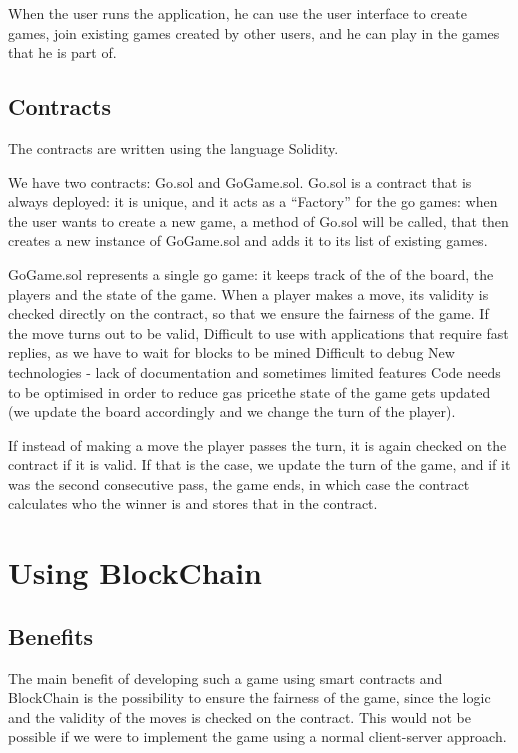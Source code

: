 \documentclass[10pt]{article}
\begin{document}
When the user runs the application, he can use the user interface to create games,
 join existing games created by other users, and he can play in the games that
 he is part of.

\subsection{Contracts}
The contracts are written using the language Solidity.

We have two contracts: {\ttfamily Go.sol} and {\ttfamily GoGame.sol}. {\ttfamily Go.sol}
is a contract that is always deployed: it is unique, and it acts as a ``Factory''
 for the go games: when the user wants to create a new game, a method of {\ttfamily Go.sol}
 will be called, that then creates a new instance of {\ttfamily GoGame.sol} and adds it
 to its list of existing games.

 {\ttfamily GoGame.sol} represents a single go game: it keeps track of the of
 the board, the players and the state of the game. When a player makes a move,
its validity is checked directly on the contract, so that we ensure the fairness
of the game. If the move turns out to be valid, Difficult to use with applications that require fast replies, as we have to wait for blocks to be mined
Difficult to debug
New technologies - lack of documentation and sometimes limited features
Code needs to be optimised in order to reduce gas pricethe state of the game gets
updated (we update the board accordingly and we change the turn of the player).

If instead of making a move the player passes the turn, it is again checked on the
contract if it is valid. If that is the case, we update the turn of the game,
and if it was the second consecutive pass, the game ends, in which case
the contract calculates who the winner is and stores that in the contract.

\section{Using BlockChain}

\subsection{Benefits}
The main benefit of developing such a game using smart contracts and BlockChain
is the possibility to ensure the fairness of the game, since the logic and the
validity of the moves is checked on the contract. This would not be possible if
we were to implement the game using a normal client-server approach.
\end{document}
